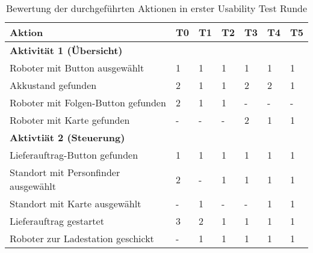 \begin{table}[H]
    \caption{Bewertung der durchgeführten Aktionen in erster Usability Test Runde}\label{tbl:1stUsabilityTestsActions}
    \begin{tabular}{l||llllll}
        Aktion                              & T0        & T1        & T2        & T3        & T4        & T5        \\ \hline
        \textbf{Aktivität 1 (Übersicht)}    &           &           &           &           &           &           \\
        Roboter mit Button ausgewählt       &         1 &         1 &         1 &         1 &         1 &         1 \\
        Akkustand gefunden                  &         2 &         1 &         1 &         2 &         2 &         1 \\
        Roboter mit Folgen-Button gefunden  &         2 &         1 &         1 &         - &         - &         - \\
        Roboter mit Karte gefunden          &         - &         - &         - &         2 &         1 &         1 \\ \hline

        \textbf{Aktivtiät 2 (Steuerung)}    &           &           &           &           &           &           \\
        Lieferauftrag-Button gefunden       &         1 &         1 &         1 &         1 &         1 &         1 \\
        Standort mit Personfinder ausgewählt&         2 &         - &         1 &         1 &         1 &         1 \\
        Standort mit Karte ausgewählt       &         - &         1 &         - &         - &         1 &         1 \\
        Lieferauftrag gestartet             &         3 &         2 &         1 &         1 &         1 &         1 \\
        Roboter zur Ladestation geschickt   &         - &         1 &         1 &         1 &         1 &         1 \\ \hline


\end{tabular}
\end{table}
